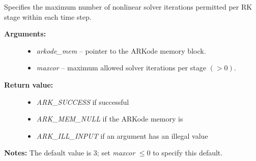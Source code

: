 \documentclass[letterpaper,10pt,english]{sphinxmanual}
\begin{document}

\begin{fulllineitems}
\label{c_interface/User_callable:c.ARKodeSetMaxNonlinIters}
Specifies the maximum number of nonlinear solver
iterations permitted per RK stage within each time step.
\begin{description}
\item[{\textbf{Arguments:}}] \leavevmode\begin{itemize}
\item {} 
\emph{arkode\_mem} -- pointer to the ARKode memory block.

\item {} 
\emph{maxcor} -- maximum allowed solver iterations per stage \((>0)\).

\end{itemize}

\item[{\textbf{Return value:}}] \leavevmode\begin{itemize}
\item {} 
\emph{ARK\_SUCCESS} if successful

\item {} 
\emph{ARK\_MEM\_NULL} if the ARKode memory is 

\item {} 
\emph{ARK\_ILL\_INPUT} if an argument has an illegal value

\end{itemize}

\end{description}

\textbf{Notes:} The default value is 3; set \emph{maxcor} \(\le 0\)
to specify this default.

\end{fulllineitems}

\end{document}
